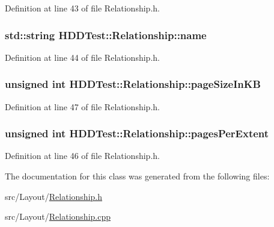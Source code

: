 Definition at line 43 of file Relationship.\-h.

\hypertarget{class_h_d_d_test_1_1_relationship_a3de1cc2d49400d4914d958a0ca17f672}{
\subsubsection[{name}]{\setlength{\rightskip}{0pt plus 5cm}std\-::string H\-D\-D\-Test\-::\-Relationship\-::name}}\label{class_h_d_d_test_1_1_relationship_a3de1cc2d49400d4914d958a0ca17f672}


Definition at line 44 of file Relationship.\-h.

\hypertarget{class_h_d_d_test_1_1_relationship_ac986788af3ce964e514a737645aa6cd1}{
\subsubsection[{page\-Size\-In\-K\-B}]{\setlength{\rightskip}{0pt plus 5cm}unsigned int H\-D\-D\-Test\-::\-Relationship\-::page\-Size\-In\-K\-B}}\label{class_h_d_d_test_1_1_relationship_ac986788af3ce964e514a737645aa6cd1}


Definition at line 47 of file Relationship.\-h.

\hypertarget{class_h_d_d_test_1_1_relationship_ada41b15d153b3baa5788de2a66295bcb}{
\subsubsection[{pages\-Per\-Extent}]{\setlength{\rightskip}{0pt plus 5cm}unsigned int H\-D\-D\-Test\-::\-Relationship\-::pages\-Per\-Extent}}\label{class_h_d_d_test_1_1_relationship_ada41b15d153b3baa5788de2a66295bcb}


Definition at line 46 of file Relationship.\-h.



The documentation for this class was generated from the following files\-:\begin{DoxyCompactItemize}
\item 
src/\-Layout/\hyperlink{_relationship_8h}{Relationship.\-h}\item 
src/\-Layout/\hyperlink{_relationship_8cpp}{Relationship.\-cpp}\end{DoxyCompactItemize}
